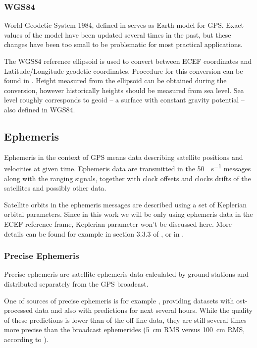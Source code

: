 \subsubsection{WGS84}
World Geodetic System 1984, defined in \cite{nima04}
serves as Earth model for GPS.
Exact values of the model have been updated several times in the past,
but these changes have been too small to be problematic for most practical
applications.

The WGS84 reference ellipsoid is used to convert between ECEF coordinates and
Latitude/Longitude geodetic coordinates.
Procedure for this conversion can be found in \cite{nima04}.
Height measured from the ellipsoid can be obtained during the conversion,
however historically heights should be measured from sea level.
Sea level roughly corresponds to geoid -- a surface with constant gravity
potential -- also defined in WGS84.



\subsection{Ephemeris}
\label{sec:gps-ephemeris}

Ephemeris in the context of GPS means data describing satellite positions and velocities
at given time.
Ephemeris data are transmitted in the \SI{50}{\bit\per\second} messages along with the ranging signals,
together with clock offsets and clocks drifts of the satellites
and possibly other data.

Satellite orbits in the ephemeris messages are described using a set of Keplerian orbital parameters.
Since in this work we will be only using ephemeris data in the ECEF reference frame, Keplerian parameter
won't be discussed here.
More details can be found for example in section 3.3.3 of \cite{rizos99}, or in \cite{kaplan06}.

\subsubsection{Precise Ephemeris}
Precise ephemeris are satellite ephemeris data calculated by ground stations
and distributed separately from the GPS broadcast.

One of sources of precise ephemeris is for example \cite{orbit-data}, providing datasets with
ost-processed data and also with predictions for next several hours.
While the quality of these predictions is lower than of the off-line data,
they are still several times more precise than the broadcast ephemerides
(\SI{5}{\centi\meter} RMS versus \SI{100}{\centi\meter} RMS, according to \cite{orbit-data}).

